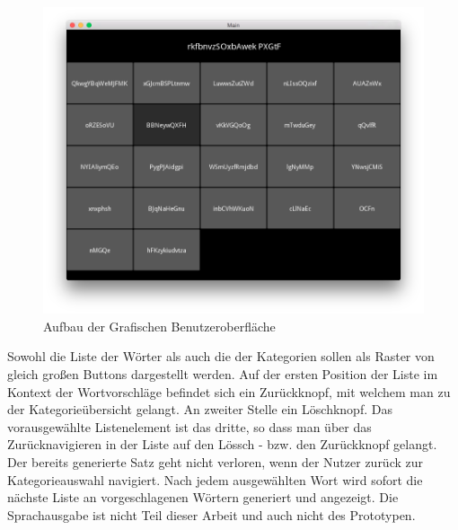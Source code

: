		\begin{figure}[H]
    		\centering
    		\includegraphics[width=15cm]{images/UI-Model.png}
    		\caption[Aufbau der Grafischen Benutzeroberfläche]{Aufbau der Grafischen Benutzeroberfläche}
    		\label{img:GUIBase}
		\end{figure}
        
        Sowohl die Liste der Wörter als auch die der Kategorien sollen als Raster von gleich großen Buttons dargestellt werden. Auf der ersten Position der Liste im Kontext der Wortvorschläge befindet sich ein Zurückknopf, mit welchem man zu der Kategorieübersicht gelangt. An zweiter Stelle ein Löschknopf. Das vorausgewählte Listenelement ist das dritte, so dass  man über das Zurücknavigieren in der Liste auf den Lössch - bzw. den Zurückknopf gelangt. Der bereits generierte Satz geht nicht verloren, wenn der Nutzer zurück zur Kategorieauswahl navigiert. Nach jedem ausgewählten Wort wird sofort die nächste Liste an vorgeschlagenen Wörtern generiert und angezeigt. Die Sprachausgabe ist nicht Teil dieser Arbeit und auch nicht des Prototypen.
	\newpage

